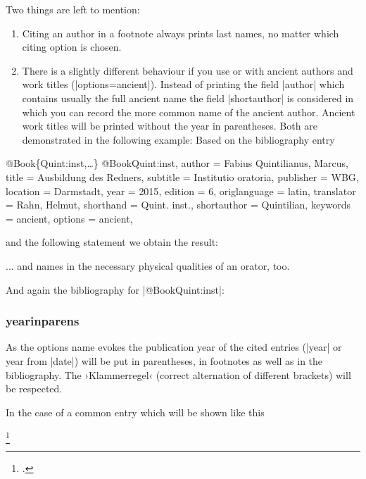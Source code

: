 \documentclass[a4paper,
10pt,
greek,
french,
spanish,
italian,
ngerman,
english
]{ltxdoc}
\begin{document}
Two things are left to mention: 
\begin{enumerate}
\item Citing an author in a footnote always prints  last names, no matter which citing option is chosen. 
\item There is a slightly different behaviour if you use   or   with ancient authors and work titles (|options={ancient}|).
Instead of printing the field |author| which contains usually the full ancient name the field |shortauthor| is considered in which you can record the more common name of the ancient author.
Ancient work titles will be printed without the year in parentheses. 
Both are demonstrated in the following example: Based on the bibliography entry
\end{enumerate}
\begin{bibexample}[label=Quint:inst]{{@}Book\{Quint:inst,…\}}
@Book{Quint:inst,
  author       = {Fabius Quintilianus, Marcus},
  title        = {Ausbildung des Redners},
  subtitle     = {Institutio oratoria},
  publisher    = WBG,
  location     = {Darmstadt},
  year         = {2015},
  edition      = {6},
  origlanguage = {latin},
  translator   = {Rahn, Helmut},
  shorthand    = {Quint. inst.},
  shortauthor  = {Quintilian},
  keywords     = {ancient},
  options      = {ancient},
}
\end{bibexample}

and the following statement we obtain the result:

\begin{refsection}
\begin{example}
... and \citeauthor{Quint:inst} names in  the  necessary physical qualities of an orator, too.
\end{example}
\end{refsection}

And again the bibliography for |@Book{Quint:inst}|:

\subsubsection{yearinparens}\label{yearinparens}
%
As the options name evokes the publication year of the cited entries 
(|year| or year from |date|) will be put in parentheses,
in footnotes as well as in the bibliography. 
The ›Klammerregel‹ (correct alternation of different brackets) will be respected.

In the case of a common entry which will be shown like this
\begin{example}
\footnote{\cite[475]{Ball2013}.}
\end{example}
\end{document}
